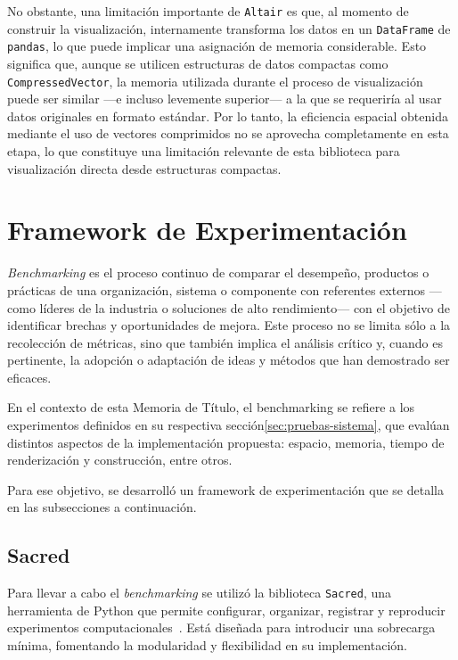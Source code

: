 No obstante, una limitación importante de \texttt{Altair} es que, al momento de construir la visualización, internamente transforma los datos en un \texttt{DataFrame} de \texttt{pandas}, lo que puede implicar una asignación de memoria considerable. Esto significa que, aunque se utilicen estructuras de datos compactas como \texttt{CompressedVector}, la memoria utilizada durante el proceso de visualización puede ser similar —e incluso levemente superior— a la que se requeriría al usar datos originales en formato estándar. Por lo tanto, la eficiencia espacial obtenida mediante el uso de vectores comprimidos no se aprovecha completamente en esta etapa, lo que constituye una limitación relevante de esta biblioteca para visualización directa desde estructuras compactas.

\section{Framework de Experimentación}
\label{benchmarking}
\textit{Benchmarking} es el proceso continuo de comparar el desempeño, productos o prácticas de una organización, sistema o componente con referentes externos —como líderes de la industria o soluciones de alto rendimiento— con el objetivo de identificar brechas y oportunidades de mejora. Este proceso no se limita sólo a la recolección de métricas, sino que también implica el análisis crítico y, cuando es pertinente, la adopción o adaptación de ideas y métodos que han demostrado ser eficaces.~\cite{stapenhurst2009benchmarking}

En el contexto de esta Memoria de Título, el benchmarking se refiere a los experimentos definidos en su respectiva sección\ref{sec:pruebas-sistema}, que evalúan distintos aspectos de la implementación propuesta: espacio, memoria, tiempo de renderización y construcción, entre otros.

Para ese objetivo, se desarrolló un framework de experimentación que se detalla en las subsecciones a continuación.

\subsection{Sacred}

Para llevar a cabo el \textit{benchmarking} se utilizó la biblioteca \texttt{Sacred}, una herramienta de Python que permite configurar, organizar, registrar y reproducir experimentos computacionales~\cite{greff2017sacred}. Está diseñada para introducir una sobrecarga mínima, fomentando la modularidad y flexibilidad en su implementación.

